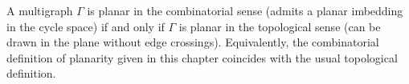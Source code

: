 A multigraph $\Gamma$ is planar in the combinatorial sense (admits a planar imbedding in the cycle space) if and only if $\Gamma$ is planar in the topological sense (can be drawn in the plane without edge crossings). Equivalently, the combinatorial definition of planarity given in this chapter coincides with the usual topological definition.

